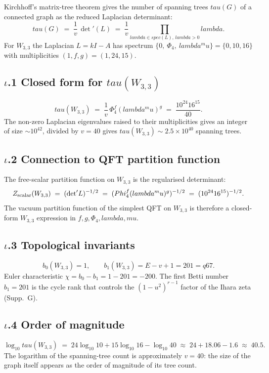 \documentclass[12pt,a4paper]{article}
\def\mathrm#1{#1}%
\def\lambda{lambda}%
\def\mu{mu}%
\def\Phi#1{Phi#1}%
\def\tau{tau}%
\def\cdot{ }%
\theoremstyle{definition}
\begin{document}
Kirchhoff's matrix-tree theorem gives the number of spanning trees
$\tau(G)$ of a connected graph as the reduced Laplacian determinant:
\[
\tau(G) \;=\; \frac{1}{v}\,{\det}'(L) \;=\; \frac{1}{v}\prod_{\lambda\in\mathrm{spec}(L),\,\lambda > 0}\lambda.
\]
For $W_{3,3}$ the Laplacian $L = kI - A$ has spectrum
$\{0,\ \Phi_4,\ \lambda^\mu\} = \{0, 10, 16\}$ with multiplicities
$(1, f, g) = (1, 24, 15)$.

\subsection*{$\iota$.1 \quad Closed form for $\tau(W_{3,3})$}
\[
\boxed{\;\tau(W_{3,3}) \;=\; \frac{1}{v}\,\Phi_4^{f}\cdot(\lambda^\mu)^{g}
\;=\; \frac{10^{24}\cdot 16^{15}}{40}.\;}
\]
The non-zero Laplacian eigenvalues raised to their multiplicities
gives an integer of size $\sim 10^{42}$, divided by $v = 40$ gives
$\tau(W_{3,3}) \sim 2.5\times 10^{40}$ spanning trees.

\subsection*{$\iota$.2 \quad Connection to QFT partition function}
The free-scalar partition function on $W_{3,3}$ is the regularised
determinant:
\[
Z_{\rm scalar}(W_{3,3}) \;=\; ({\det}' L)^{-1/2}
\;=\; (\Phi_4^f\cdot(\lambda^\mu)^g)^{-1/2}
\;=\; (10^{24}\cdot 16^{15})^{-1/2}.
\]
The vacuum partition function of the simplest QFT on $W_{3,3}$ is
therefore a closed-form $W_{3,3}$ expression in $f, g, \Phi_4, \lambda, \mu$.

\subsection*{$\iota$.3 \quad Topological invariants}
\[
b_0(W_{3,3}) = 1,\qquad b_1(W_{3,3}) = E - v + 1 = 201 = q\cdot 67.
\]
Euler characteristic $\chi = b_0 - b_1 = 1 - 201 = -200$. The first
Betti number $b_1 = 201$ is the cycle rank that controls the
$(1-u^2)^{r-1}$ factor of the Ihara zeta (Supp.~G).

\subsection*{$\iota$.4 \quad Order of magnitude}
\[
\log_{10}\tau(W_{3,3}) \;=\; 24\log_{10}10 + 15\log_{10}16 - \log_{10}40
\;\approx\; 24 + 18.06 - 1.6 \;\approx\; 40.5.
\]
The logarithm of the spanning-tree count is approximately $v = 40$:
the size of the graph itself appears as the order of magnitude of
its tree count.
\end{document}
